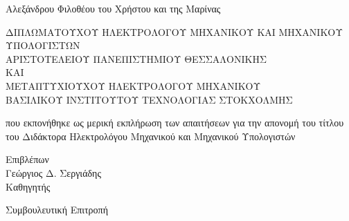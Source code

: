 \begin{center}
   {Αλεξάνδρου Φιλοθέου του Χρήστου και της Μαρίνας}

   \vspace{0.5cm}

   {\footnotesize ΔΙΠΛΩΜΑΤΟΥΧΟΥ ΗΛΕΚΤΡΟΛΟΓΟΥ ΜΗΧΑΝΙΚΟΥ ΚΑΙ ΜΗΧΑΝΙΚΟΥ ΥΠΟΛΟΓΙΣΤΩΝ\\}
   {\footnotesize ΑΡΙΣΤΟΤΕΛΕΙΟΥ ΠΑΝΕΠΙΣΤΗΜΙΟΥ ΘΕΣΣΑΛΟΝΙΚΗΣ\\}
   {\footnotesize ΚΑΙ\\}
   {\footnotesize ΜΕΤΑΠΤΥΧΙΟΥΧΟΥ ΗΛΕΚΤΡΟΛΟΓΟΥ ΜΗΧΑΝΙΚΟΥ\\}
   {\footnotesize ΒΑΣΙΛΙΚΟΥ ΙΝΣΤΙΤΟΥΤΟΥ ΤΕΧΝΟΛΟΓΙΑΣ ΣΤΟΚΧΟΛΜΗΣ\\}

   \vspace{0.7cm}

   {που εκπονήθηκε ως μερική εκπλήρωση των απαιτήσεων για την απονομή του
   τίτλου του Διδάκτορα Ηλεκτρολόγου Μηχανικού και Μηχανικού Υπολογιστών}

   \vspace{1.6cm}

   {Επιβλέπων\\}
   \vspace{-0.2cm}
   {Γεώργιος Δ. Σεργιάδης\\}
   \vspace{-0.2cm}
   {Καθηγητής}

   \vspace{0.4cm}

   {Συμβουλευτική Επιτροπή\\ \vspace{0.4cm}}

  \noindent{}


\end{center}
